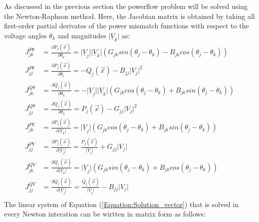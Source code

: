 \noindent As discussed in the previous section the powerflow problem will be solved using  the Newton-Raphson method. Here, the Jacobian matrix is obtained by taking all first-order partial derivates of the power mismatch functions with respect to the voltage angles $\theta_{k}$ and magnitudes $\vert \underline{V}_{k} \vert$ as:
\begin{align}
	J_{jk}^{P \theta} &= \frac{\partial P_{j} (\vec{x} ) } {\partial \theta_{k}} = \vert \underline{V}_{j} \vert \vert \underline{V}_{k} \vert \left ( G_{jk} sin(\theta_{j} - \theta_{k}) - 																B_{jk} cos(\theta_{j} - \theta_{k} ) \right ) \\
	J_{jj}^{P \theta} &= \frac{\partial P_{j}(\vec{x})}{\partial \theta_{j}} = -Q_{j} (\vec{x} ) - B_{jj} \vert V_{j} \vert ^{2} \\
	J_{jk}^{Q \theta} &= \frac{\partial Q_{j}(\vec{x})}{\partial \theta_{k}} = - \vert \underline{V}_{j} \vert \vert \underline{V}_{k} \vert \left ( G_{jk} cos(\theta_{j} - \theta_{k}) + 																B_{jk} sin(\theta_{j} - \theta_{k}) \right ) \\
	 J_{jj}^{Q \theta} &= \frac{\partial Q_{j}(\vec{x})}{\partial \theta_{k}} = P_{j} (\vec{x} ) - G_{jj} \vert V_{j} \vert ^{2} \\
	 J_{jk}^{PV} &= \frac{\partial P_{j} (\vec{x} ) } {\partial \vert \underline{V}_{k} \vert } = \vert \underline{V}_{j} \vert \left ( G_{jk} cos(\theta_{j} - \theta_{k}) + 																B_{jk} sin(\theta_{j} - \theta_{k}) \right ) \\
	 J_{jj}^{PV} &= \frac{\partial P_{j}(\vec{x})}{\partial \vert \underline{V}_{j} \vert } = \frac{P_{j} (\vec{x} )}{\vert \underline{V}_{j} \vert}  + G_{jj} \vert V_{j} \vert \\
	 J_{jk}^{QV} &= \frac{\partial Q_{j} (\vec{x} ) } {\partial \vert \underline{V}_{k} \vert } = \vert \underline{V}_{j} \vert \left ( G_{jk} sin(\theta_{j} - \theta_{k}) + 																B_{jk} cos(\theta_{j} - \theta_{k}) \right ) \\
	 J_{jj}^{QV} &= \frac{\partial Q_{j}(\vec{x})}{\partial \vert \underline{V}_{j} \vert } = \frac{Q_{j} (\vec{x} )}{\vert \underline{V}_{j} \vert}  - B_{jj} \vert V_{j} \vert \\
\end{align}
The linear system of Equation (\ref{Equation:Solution_vector}) that is solved in every Newton interation can be wirtten in matrix form as follows:

